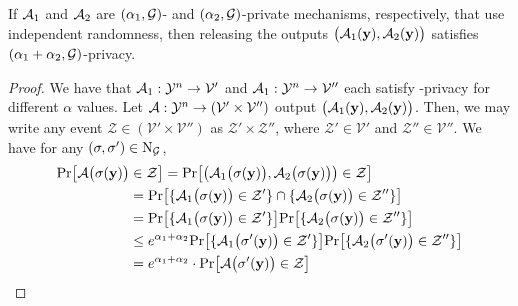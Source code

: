 \begin{thm} \label{theorem:seq}
If $\mathcal{A}_1$ and $\mathcal{A}_2$ are $(\alpha_1, \mathcal{G})$- and $(\alpha_2, \mathcal{G})$-\name private mechanisms, respectively, that use independent randomness, then releasing the outputs $\big( \mathcal{A}_1(\mathbf{y}), \mathcal{A}_2(\mathbf{y}) \big)$ satisfies $(\alpha_1+\alpha_2, \mathcal{G})$-\name privacy. 
\end{thm}
\begin{proof}
We have that $\mathcal{A}_1: \mathcal{Y}^n \rightarrow \mathcal{V}'$ and $\mathcal{A}_1: \mathcal{Y}^n \rightarrow \mathcal{V}''$ each satisfy \name-privacy for different $\alpha$ values. Let $\mathcal{A}:\mathcal{Y}^n \rightarrow (\mathcal{V}' \times \mathcal{V}'')$ output $\big(\mathcal{A}_1(\mathbf{y}), \mathcal{A}_2(\mathbf{y})\big)$. Then, we may write any event $\mathcal{Z} \in (\mathcal{V}' \times \mathcal{V}'')$ as $\mathcal{Z}' \times \mathcal{Z}''$, where $\mathcal{Z}' \in \mathcal{V}'$ and $\mathcal{Z}'' \in \mathcal{V}''$. We have for any $(\sigma, \sigma') \in \mathrm{N}_{\mathcal{G}}$, 
\begin{align*}
    \mathrm{Pr} \big[ \mathcal{A}\big( \sigma(\mathbf{y}) \big)  &\in \mathcal{Z} \big]  
    = \mathrm{Pr} \big[ \big(\mathcal{A}_1\big( \sigma(\mathbf{y}) \big) , \mathcal{A}_2\big( \sigma(\mathbf{y}) \big) \big) \in \mathcal{Z} \big] \\
    &= \mathrm{Pr} \big[ \{\mathcal{A}_1\big( \sigma(\mathbf{y}) \big)  \in \mathcal{Z}'\} \cap \{\mathcal{A}_2\big( \sigma(\mathbf{y}) \big)   \in \mathcal{Z}'' \} \big]  \\
    &= \mathrm{Pr} \big[ \{\mathcal{A}_1\big( \sigma(\mathbf{y}) \big)  \in \mathcal{Z}'\} \big] 
    \mathrm{Pr} \big[ \{\mathcal{A}_2\big( \sigma(\mathbf{y}) \big)   \in \mathcal{Z}'' \} \big] \\
    &\leq e^{\alpha_1 + \alpha_2}
    \mathrm{Pr} \big[ \{\mathcal{A}_1\big( \sigma'(\mathbf{y}) \big)  \in \mathcal{Z}'\} \big] 
    \mathrm{Pr} \big[ \{\mathcal{A}_2\big( \sigma'(\mathbf{y}) \big)   \in \mathcal{Z}'' \} \big] \\
    &= e^{\alpha_1 + \alpha_2} \cdot 
    \mathrm{Pr} \big[ \mathcal{A}\big( \sigma'(\mathbf{y}) \big)  \in \mathcal{Z} \big] 
\end{align*}
\end{proof}


